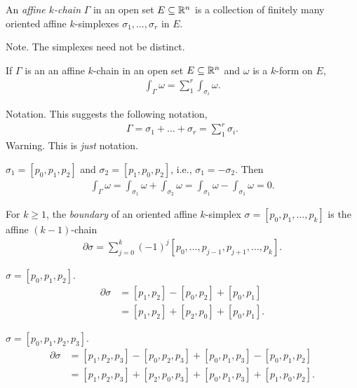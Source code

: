 \documentclass[11pt]{article}
\begin{document}
\begin{definition} An \emph{affine $k$-chain} $\Gamma$ in an open set $E \subseteq \mathbb{R}^n$ is a collection of finitely many oriented affine $k$-simplexes $\sigma_1, \dots, \sigma_r$ in $E$.

  Note. The simplexes need not be distinct.
\end{definition}

\begin{definition} If $\Gamma$ is an an affine $k$-chain in an open set $E \subseteq \mathbb{R}^n$ and $\omega$ is a $k$-form on $E$, \begin{align*} \int_{\Gamma} \omega = \sum_1^r \int_{\sigma_i} \omega.
\end{align*}
\end{definition}

Notation. This suggests the following notation, \begin{align*} \Gamma = \sigma_1 + \dots + \sigma_r = \sum_1^r \sigma_i.
\end{align*} Warning. This is \emph{just} notation.

\begin{example} $\sigma_1 = [p_0, p_1, p_2]$ and $\sigma_2 = [p_1, p_0, p_2]$, i.e., $\sigma_1 = -\sigma_2$. Then \begin{align*} \int_{\Gamma} \omega = \int_{\sigma_1} \omega + \int_{\sigma_2} \omega = \int_{\sigma_1} \omega - \int_{\sigma_1} \omega = 0.
\end{align*}
\end{example}

\begin{definition} For $k \ge 1$, the \emph{boundary} of an oriented affine $k$-simplex $\sigma = [p_0, p_1, \dots, p_k]$ is the affine $(k - 1)$-chain \begin{align*} \partial \sigma = \sum_{j = 0}^k (-1)^j [p_0, \dots, p_{j - 1}, p_{j + 1}, \dots, p_k].
\end{align*}
\end{definition}

\begin{example} $\sigma = [p_0, p_1, p_2]$. \begin{align*} \partial \sigma & = [p_1, p_2] - [p_0, p_2] + [p_0, p_1] \\ & = [p_1, p_2] + [p_2, p_0] + [p_0, p_1].
\end{align*}
\end{example}

\begin{example} $\sigma = [p_0, p_1, p_2, p_3]$. \begin{align*} \partial \sigma & = [p_1, p_2, p_3] - [p_0, p_2, p_3] + [p_0, p_1, p_3] - [p_0, p_1, p_2] \\ & = [p_1, p_2, p_3] + [p_2, p_0, p_3] + [p_0, p_1, p_3] + [p_1, p_0, p_2].
\end{align*}
\end{example}
\end{document}
